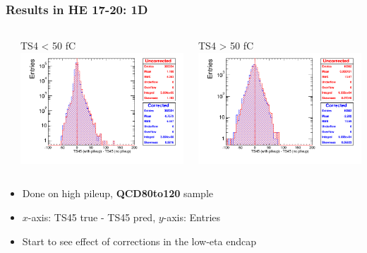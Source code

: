 \documentclass[bigger]{beamer}
\providecommand{\alert}[1]{\textbf{#1}}
\begin{document}
\begin{frame}
\frametitle{Results in HE 17-20: 1D}
\label{sec-3-3-7}
\begin{columns} %
\label{sec-3-3-7-1}
\begin{column}{0.55\textwidth}
\label{sec-3-3-7-1-1}

\centering
TS4 < 50 fC
\includegraphics[width=\textwidth]{fig/correction_comparison_1D_sample80to120_under50_ring1.png}
\end{column}
\begin{column}{0.55\textwidth}
\label{sec-3-3-7-1-2}

\centering
TS4 > 50 fC
\includegraphics[width=\textwidth]{fig/correction_comparison_1D_sample80to120_over50_ring1.png}
\end{column}
\end{columns}
\label{sec-3-3-7-2}
\begin{itemize}

\item Done on high pileup, \alert{QCD80to120} sample
\label{sec-3-3-7-2-1}%

\item $x$-axis: TS45 true - TS45 pred, $y$-axis: Entries
\label{sec-3-3-7-2-2}%

\item Start to see effect of corrections in the low-eta endcap
\label{sec-3-3-7-2-3}%
\end{itemize} %
\end{frame}
\end{document}
